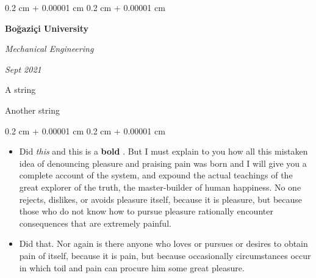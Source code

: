 \documentclass[10pt, letterpaper]{article}
\newenvironment{summary}{
    \begin{description}[
        topsep=0.10 cm,
        parsep=0.10 cm,
        partopsep=0pt,
        itemsep=0pt,
        leftmargin=0.4 cm + 10pt
    ]
}{
    \end{description}
} %
\newenvironment{highlights}{
    \begin{itemize}[
        topsep=0.10 cm,
        parsep=0.10 cm,
        partopsep=0pt,
        itemsep=0pt,
        leftmargin=0.4 cm + 10pt
    ]
}{
    \end{itemize}
} %
\newenvironment{onecolentry}{
    \begin{adjustwidth}{
        0.2 cm + 0.00001 cm
    }{
        0.2 cm + 0.00001 cm
    }
}{
    \end{adjustwidth}
} %
\newenvironment{twocolentry}[2][]{
    \onecolentry
    \def\secondColumn{#2}
    \setcolumnwidth{\fill, 4.5 cm}
    \begin{paracol}{2}
}{
    \switchcolumn \raggedleft \secondColumn
    \end{paracol}
    \endonecolentry
} %
\let\hrefWithoutArrow\href
\renewcommand{\href}[2]{\hrefWithoutArrow{#1}{\ifthenelse{\equal{#2}{}}{ }{#2 }\raisebox{.15ex}{\footnotesize \faExternalLink*}}}
\begin{document}
        \begin{twocolentry}{
            
            
        \textit{Sept 2021}}
            \textbf{Boğaziçi University}

            \textit{Mechanical Engineering}
        \end{twocolentry}
            \begin{summary}
                \item A string
                \item Another string
            \end{summary}
        \vspace{0.10 cm}
        \begin{onecolentry}
            \begin{highlights}
                \item Did \textit{this} and this is a \textbf{bold} \href{https://example.com}{link}. But I must explain to you how all this mistaken idea of denouncing pleasure and praising pain was born and I will give you a complete account of the system, and expound the actual teachings of the great explorer of the truth, the master-builder of human happiness. No one rejects, dislikes, or avoids pleasure itself, because it is pleasure, but because those who do not know how to pursue pleasure rationally encounter consequences that are extremely painful.
                \item Did that. Nor again is there anyone who loves or pursues or desires to obtain pain of itself, because it is pain, but because occasionally circumstances occur in which toil and pain can procure him some great pleasure.
            \end{highlights}
        \end{onecolentry}


        \vspace{0.2 cm}
\end{document}
